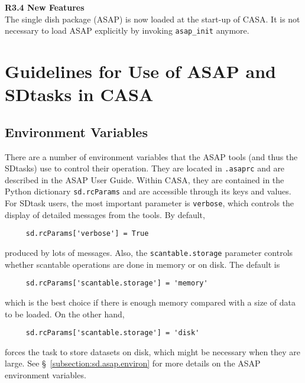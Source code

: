 \medskip
{\bf R3.4 New Features}\\
The single dish package (ASAP) is now loaded at the start-up of CASA. 
It is not necessary to load ASAP explicitly by invoking {\tt asap\_init}
anymore.


\section{Guidelines for Use of ASAP and SDtasks in CASA}
\label{section:sd.intro}

\subsection{Environment Variables}
\label{section:sd.intro.env}

There are a number of environment variables that the ASAP tools
(and thus the SDtasks) use to control their operation.
They are located in {\tt .asaprc} and are described in the ASAP User Guide.
Within CASA, they are contained in the
Python dictionary {\tt sd.rcParams} and are accessible through
its keys and values.  For SDtask users, the most important parameter is
{\tt verbose}, which controls the display of detailed
messages from the tools. By default,
\small
\begin{verbatim}
     sd.rcParams['verbose'] = True
\end{verbatim}
\normalsize
produced by lots of messages.  Also, the {\tt scantable.storage}
parameter controls whether scantable operations are done
in memory or on disk.  The default is  
\small
\begin{verbatim}
     sd.rcParams['scantable.storage'] = 'memory'  
\end{verbatim}
\normalsize
which is the best choice if there is enough memory
compared with a size of data to be loaded.  On the other hand,
\small
\begin{verbatim}
     sd.rcParams['scantable.storage'] = 'disk'
\end{verbatim}
\normalsize
forces the task to store datasets on disk, which might be necessary when they are large.
See \S~\ref{subsection:sd.asap.environ} for more details on the
ASAP environment variables.

